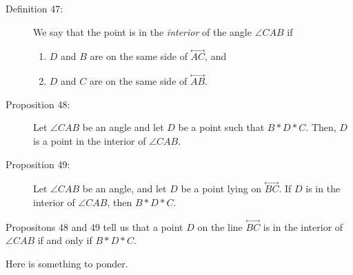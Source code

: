 \documentclass{article}
\newcommand{\linethrough}[1]{\stackrel{\longleftrightarrow}{#1} }
\begin{document}
\begin{description}
\item[Definition 47:] We say that the point is in the \emph{interior} of the angle $\angle CAB$ if
\begin{enumerate}[\hspace{1cm}1.]
  \item $D$ and $B$ are on the same side of $\linethrough{AC}$, and
  \item $D$ and $C$ are on the same side of $\linethrough{AB}$.
\end{enumerate}

\item[Proposition 48:] Let $\angle CAB$ be an angle and let $D$ be a point such that $B*D*C$. Then, $D$ is a point in the interior of $\angle CAB$.

\item[Proposition 49:] Let $\angle CAB$ be an angle, and let $D$ be a point lying on $\linethrough{BC}$. If $D$ is in the interior of $\angle CAB$, then $B*D*C$.

\end{description}

Propositons 48 and 49 tell us that a point $D$ on the line $\linethrough{BC}$ is in the interior of $\angle{CAB}$ if and only if $B*D*C$.

\vspace{0.3cm}

Here is something to ponder.
\end{document}
